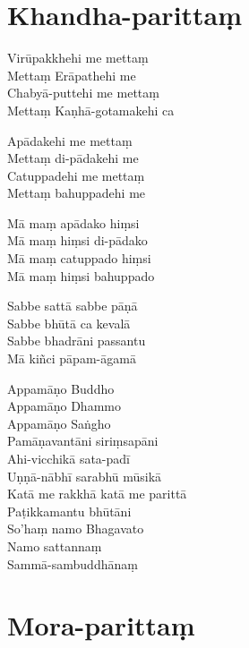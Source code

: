 \chapter{Khandha-parittaṃ}%

\begin{paritta}
Virūpakkhehi me mettaṃ\\
Mettaṃ Erāpathehi me\\
Chabyā-puttehi me mettaṃ\\
Mettaṃ Kaṇhā-gotamakehi ca

Apādakehi me mettaṃ\\
Mettaṃ di-pādakehi me\\
Catuppadehi me mettaṃ\\
Mettaṃ bahuppadehi me

Mā maṃ apādako hiṃsi\\
Mā maṃ hiṃsi di-pādako\\
Mā maṃ catuppado hiṃsi\\
Mā maṃ hiṃsi bahuppado

Sabbe sattā sabbe pāṇā\\
Sabbe bhūtā ca kevalā\\
Sabbe bhadrāni passantu\\
Mā kiñci pāpam-āgamā

Appamāṇo Buddho\\
Appamāṇo Dhammo\\
Appamāṇo Saṅgho\\
Pamāṇavantāni siriṃsapāni\\
Ahi-vicchikā sata-padī\\
Uṇṇā-nābhī sarabhū mūsikā\\
Katā me rakkhā katā me parittā\\
Paṭikkamantu bhūtāni\\
So'haṃ namo Bhagavato\\
Namo sattannaṃ\\
Sammā-sambuddhānaṃ

\end{paritta}

\chapter{Mora-parittaṃ}%

